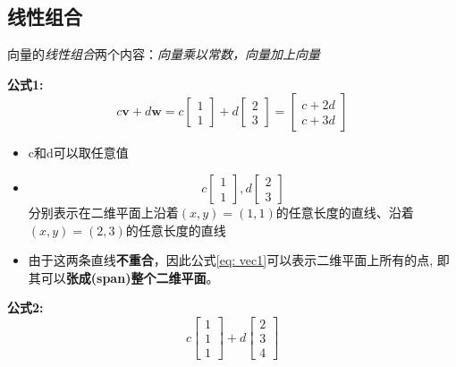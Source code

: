 \documentclass{book}
\begin{document}
\subsection{线性组合}
  \label{sec:vectorIntro}
  向量的\textit{线性组合}两个内容：\textit{向量乘以常数，向量加上向量}

  \textbf{公式1:}
\begin{equation}c \boldsymbol{v}+d \boldsymbol{w}=c\left[\begin{array}{l}1 \\ 1\end{array}\right]+d\left[\begin{array}{l}2 \\ 3\end{array}\right]=\left[\begin{array}{l}c+2 d \\ c+3 d\end{array}\right]\label{eq: vec1}\end{equation}

  \begin{itemize}
    \item c和d可以取任意值
    \item   
      \begin{equation*}
              c\left[\begin{array}{c}
                1\\1
              \end{array}\right],
              d\left[
                \begin{array}{c}
                2\\3 
                \end{array}
                \right]
      \end{equation*}
      分别表示在二维平面上沿着$(x,y)=(1,1)$的任意长度的直线、沿着$(x,y)=(2,3)$的任意长度的直线
    \item 由于这两条直线\textbf{不重合}，因此公式\ref{eq: vec1}可以表示二维平面上所有的点, 即其可以\textbf{张成(span)整个二维平面}。
  \end{itemize}


\textbf{公式2:}
\begin{equation}
  c\left[\begin{array}{c}
  1\\1\\1
\end{array}\right]+
  d\left[\begin{array}{c}
    2\\3\\4
  \end{array}\right]
  \label{eq: vec2}
\end{equation}
\end{document}
